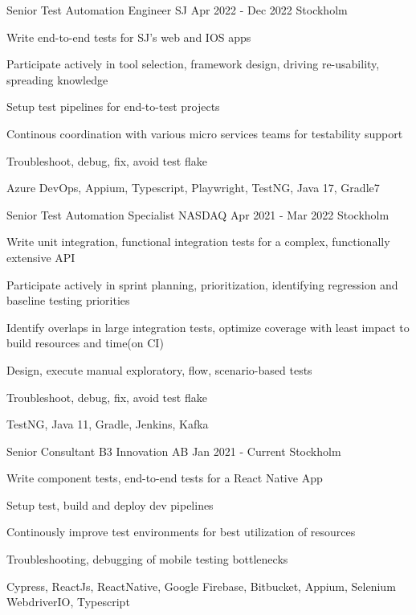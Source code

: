 \documentclass[11pt, a4paper]{awesome-cv}
\begin{document}
  \begin{cventries}

    \cventry
    {Senior Test Automation Engineer}
    {SJ}
    {Apr 2022 - Dec 2022}
    {Stockholm}
    {
      \begin{cvitems}
        \item Write end-to-end tests for SJ's web and IOS apps 
        \item Participate actively in tool selection, framework design, driving re-usability, spreading knowledge
        \item Setup test pipelines for end-to-test projects
        \item Continous coordination with various micro services teams for testability support
        \item Troubleshoot, debug, fix, avoid test flake
        \item Azure DevOps, Appium, Typescript, Playwright, TestNG, Java 17, Gradle7
      \end{cvitems}
    }

    \cventry
    {Senior Test Automation Specialist}
    {NASDAQ}
    {Apr 2021 - Mar 2022}
    {Stockholm}
    {
      \begin{cvitems}
        \item Write unit integration, functional integration tests for a complex, functionally extensive API 
        \item Participate actively in sprint planning, prioritization, identifying regression and baseline testing priorities
        \item Identify overlaps in large integration tests, optimize coverage with least impact to build resources and time(on CI)
        \item Design, execute manual exploratory, flow, scenario-based tests
        \item Troubleshoot, debug, fix, avoid test flake
        \item TestNG, Java 11, Gradle, Jenkins, Kafka
      \end{cvitems}
    }

    \cventry
    {Senior Consultant}
    {B3 Innovation AB}
    {Jan 2021 - Current}
    {Stockholm}
    {
      \begin{cvitems}
        \item Write component tests, end-to-end tests for a React Native App 
        \item Setup test, build and deploy dev pipelines
        \item Continously improve test environments for best utilization of resources
        \item Troubleshooting, debugging of mobile testing bottlenecks
        \item Cypress, ReactJs, ReactNative, Google Firebase, Bitbucket, Appium, Selenium WebdriverIO, Typescript
      \end{cvitems}
    }


\end{cventries}
\end{document}
